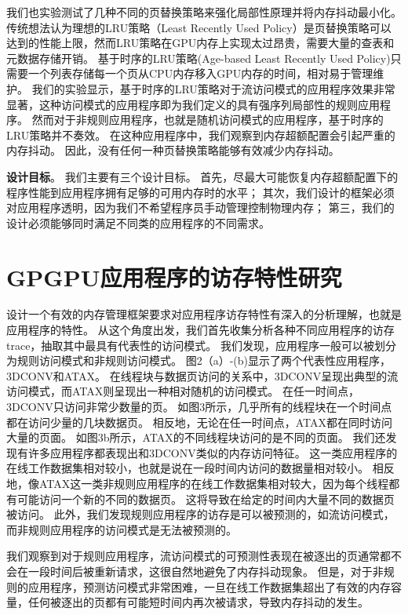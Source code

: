 我们也实验测试了几种不同的页替换策略来强化局部性原理并将内存抖动最小化。
传统想法认为理想的LRU策略（Least Recently Used Policy）是页替换策略可以达到的性能上限，然而LRU策略在GPU内存上实现太过昂贵，需要大量的查表和元数据存储开销。
基于时序的LRU策略(Age-based Least Recently Used Policy)只需要一个列表存储每一个页从CPU内存移入GPU内存的时间，相对易于管理维护。
我们的实验显示，基于时序的LRU策略对于流访问模式的应用程序效果非常显著，这种访问模式的应用程序即为我们定义的具有强序列局部性的规则应用程序。
然而对于非规则应用程序，也就是随机访问模式的应用程序，基于时序的LRU策略并不奏效。
在这种应用程序中，我们观察到内存超额配置会引起严重的内存抖动。
因此，没有任何一种页替换策略能够有效减少内存抖动。

\textbf{设计目标}。
我们主要有三个设计目标。
首先，尽最大可能恢复内存超额配置下的程序性能到应用程序拥有足够的可用内存时的水平；
其次，我们设计的框架必须对应用程序透明，因为我们不希望程序员手动管理控制物理内存；
第三，我们的设计必须能够同时满足不同类的应用程序的不同需求。

\section{GPGPU应用程序的访存特性研究}

设计一个有效的内存管理框架要求对应用程序访存特性有深入的分析理解，也就是应用程序的特性。
从这个角度出发，我们首先收集分析各种不同应用程序的访存trace，抽取其中最具有代表性的访问模式。
我们发现，应用程序一般可以被划分为规则访问模式和非规则访问模式。
图2（a）-(b)显示了两个代表性应用程序，3DCONV和ATAX。
在线程块与数据页访问的关系中，3DCONV呈现出典型的流访问模式，而ATAX则呈现出一种相对随机的访问模式。
在任一时间点，3DCONV只访问非常少数量的页。
如图3所示，几乎所有的线程块在一个时间点都在访问少量的几块数据页。
相反地，无论在任一时间点，ATAX都在同时访问大量的页面。
如图3b所示，ATAX的不同线程块访问的是不同的页面。
我们还发现有许多应用程序都表现出和3DCONV类似的内存访问特征。
这一类应用程序的在线工作数据集相对较小，也就是说在一段时间内访问的数据量相对较小。
相反地，像ATAX这一类非规则应用程序的在线工作数据集相对较大，因为每个线程都有可能访问一个新的不同的数据页。
这将导致在给定的时间内大量不同的数据页被访问。
此外，我们发现规则应用程序的访存是可以被预测的，如流访问模式，而非规则应用程序的访问模式是无法被预测的。

我们观察到对于规则应用程序，流访问模式的可预测性表现在被逐出的页通常都不会在一段时间后被重新请求，这很自然地避免了内存抖动现象。
但是，对于非规则的应用程序，预测访问模式非常困难，一旦在线工作数据集超出了有效的内存容量，任何被逐出的页都有可能短时间内再次被请求，导致内存抖动的发生。

